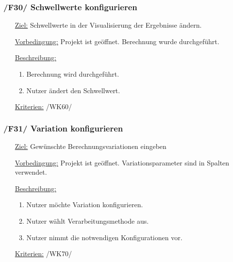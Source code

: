 \documentclass{article}
\begin{document}
\subsubsection*{\textbf{/F30/} Schwellwerte konfigurieren} \label{sec:f:Schwellwerte konfigurieren}
\begin{itemize}
    \item[\underline{Ziel:}] Schwellwerte in der Visualisierung der Ergebnisse ändern.
    \item[\underline{Vorbedingung:}] Projekt ist geöffnet. Berechnung wurde durchgeführt.
    \item[\underline{Beschreibung:}]
    \begin{enumerate}
        \item Berechnung wird durchgeführt.
        \item Nutzer ändert den Schwellwert.
    \end{enumerate}
    \item[\underline{Kriterien:}] /WK60/
\end{itemize}

\subsubsection*{\textbf{/F31/} Variation konfigurieren} \label{sec:f:Variation konfigurieren}
\begin{itemize}
    \item[\underline{Ziel:}] Gewünschte Berechnungsvariationen eingeben
    \item[\underline{Vorbedingung:}] Projekt ist geöffnet. Variationsparameter sind in Spalten verwendet.
    \item[\underline{Beschreibung:}]
    \begin{enumerate}
        \item Nutzer möchte Variation konfigurieren.
        \item Nutzer wählt Verarbeitungsmethode aus.
        \item Nutzer nimmt die notwendigen Konfigurationen vor.
    \end{enumerate}
    \item[\underline{Kriterien:}] /WK70/
\end{itemize}
\end{document}
